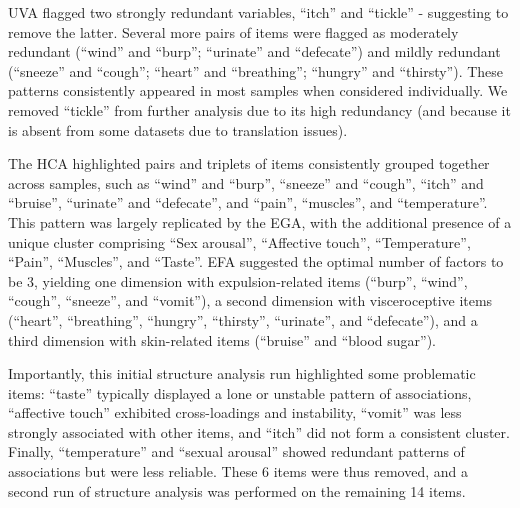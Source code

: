 \documentclass[
  jou,
  floatsintext,
  longtable,
  nolmodern,
  notxfonts,
  notimes,
  colorlinks=true,linkcolor=blue,citecolor=blue,urlcolor=blue]{apa7}
\begin{document}
UVA flagged two strongly redundant variables, ``itch'' and ``tickle'' -
suggesting to remove the latter. Several more pairs of items were
flagged as moderately redundant (``wind'' and ``burp''; ``urinate'' and
``defecate'') and mildly redundant (``sneeze'' and ``cough''; ``heart''
and ``breathing''; ``hungry'' and ``thirsty''). These patterns
consistently appeared in most samples when considered individually. We
removed ``tickle'' from further analysis due to its high redundancy (and
because it is absent from some datasets due to translation issues).

The HCA highlighted pairs and triplets of items consistently grouped
together across samples, such as ``wind'' and ``burp'', ``sneeze'' and
``cough'', ``itch'' and ``bruise'', ``urinate'' and ``defecate'', and
``pain'', ``muscles'', and ``temperature''. This pattern was largely
replicated by the EGA, with the additional presence of a unique cluster
comprising ``Sex arousal'', ``Affective touch'', ``Temperature'',
``Pain'', ``Muscles'', and ``Taste''. EFA suggested the optimal number
of factors to be 3, yielding one dimension with expulsion-related items
(``burp'', ``wind'', ``cough'', ``sneeze'', and ``vomit''), a second
dimension with visceroceptive items (``heart'', ``breathing'',
``hungry'', ``thirsty'', ``urinate'', and ``defecate''), and a third
dimension with skin-related items (``bruise'' and ``blood sugar'').

Importantly, this initial structure analysis run highlighted some
problematic items: ``taste'' typically displayed a lone or unstable
pattern of associations, ``affective touch'' exhibited cross-loadings
and instability, ``vomit'' was less strongly associated with other
items, and ``itch'' did not form a consistent cluster. Finally,
``temperature'' and ``sexual arousal'' showed redundant patterns of
associations but were less reliable. These 6 items were thus removed,
and a second run of structure analysis was performed on the remaining 14
items.
\end{document}

